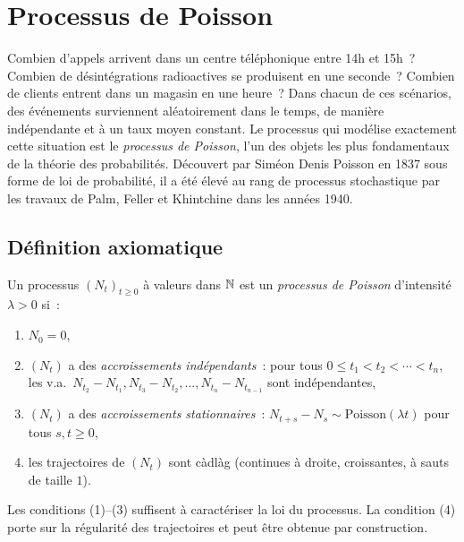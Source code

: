 \chapter{Processus de Poisson}
\label{ch:poisson}

Combien d'appels arrivent dans un centre t\'el\'ephonique entre 14h et 15h~? Combien de d\'esint\'egrations radioactives se produisent en une seconde~? Combien de clients entrent dans un magasin en une heure~? Dans chacun de ces sc\'enarios, des \'ev\'enements surviennent al\'eatoirement dans le temps, de mani\`ere ind\'ependante et \`a un taux moyen constant. Le processus qui mod\'elise exactement cette situation est le \emph{processus de Poisson}, l'un des objets les plus fondamentaux de la th\'eorie des probabilit\'es. D\'ecouvert par Sim\'eon Denis Poisson en 1837 sous forme de loi de probabilit\'e, il a \'et\'e \'elev\'e au rang de processus stochastique par les travaux de Palm, Feller et Khintchine dans les ann\'ees 1940.

\section{D\'efinition axiomatique}

\begin{definition}
\label{def:poisson}
Un processus $(N_t)_{t \geq 0}$ \`a valeurs dans $\mathbb{N}$ est un \emph{processus de
Poisson} d'intensit\'e $\lambda > 0$ si~:
\begin{enumerate}
  \item $N_0 = 0$,
  \item $(N_t)$ a des \emph{accroissements ind\'ependants}~: pour tous
    $0 \leq t_1 < t_2 < \cdots < t_n$, les v.a.\ $N_{t_2} - N_{t_1},
    N_{t_3} - N_{t_2}, \ldots, N_{t_n} - N_{t_{n-1}}$ sont ind\'ependantes,
  \item $(N_t)$ a des \emph{accroissements stationnaires}~:
    $N_{t+s} - N_s \sim \text{Poisson}(\lambda t)$ pour tous $s, t \geq 0$,
  \item les trajectoires de $(N_t)$ sont c\`adl\`ag (continues \`a droite, croissantes,
    \`a sauts de taille $1$).
\end{enumerate}
\end{definition}

\begin{remarque}
Les conditions (1)--(3) suffisent \`a caract\'eriser la loi du processus.
La condition (4) porte sur la r\'egularit\'e des trajectoires et peut \^etre obtenue
par construction.
\end{remarque}

